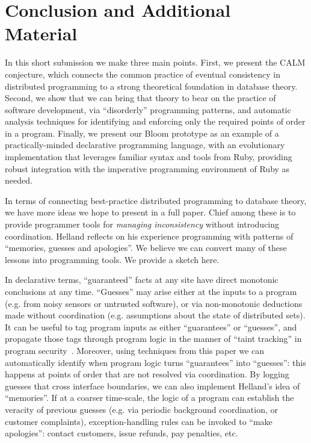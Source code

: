 \section{Conclusion and Additional Material}
\label{sec:conclusion}
In this short submission we make three main points.  First, we present the CALM conjecture, which connects the common practice of eventual consistency in distributed programming to a strong theoretical foundation in database theory.  Second, we show that we can bring that theory to bear on the practice of software development, via ``disorderly'' programming patterns, and automatic analysis techniques for  identifying and enforcing only the required points of order in a program. Finally, we present our Bloom prototype as an example of a practically-minded declarative programming language, with an evolutionary implementation that leverages familiar syntax and tools from Ruby, providing robust integration with the imperative programming environment of Ruby as needed.

In terms of connecting best-practice distributed programming to database theory, we have more ideas we hope to present in a full paper.  Chief among these is to provide programmer tools for \emph{managing inconsistency} without introducing coordination.  Helland reflects on his experience programming with patterns of ``memories, guesses and apologies''.  We believe we can convert many of these lessons into programming tools.  We provide a sketch here.

In declarative terms, ``guaranteed'' facts at any site have direct monotonic conclusions at any time.  ``Guesses'' may arise either at the inputs to a program (e.g. from noisy sensors or untrusted software), or via non-monotonic deductions made without coordination (e.g. assumptions about the state of distributed sets).  It can be useful to tag program inputs as either ``guarantees'' or ``guesses'', and propagate those tags through program logic in the manner of ``taint tracking'' in program security~\cite{taint}.  Moreover, using techniques from this paper we can automatically identify when program logic turns ``guarantees'' into ``guesses'': this happens at points of order that are not resolved via coordination.    
By logging guesses that cross interface boundaries, we can also implement Helland's idea of ``memories''.  If at a coarser time-scale, the logic of a program can establish the veracity of previous guesses (e.g. via periodic background coordination, or customer complaints), exception-handling rules can be invoked to ``make apologies'': contact customers, issue refunds, pay penalties, etc.  

